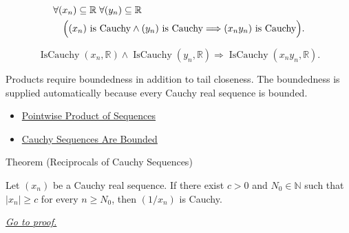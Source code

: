 \begin{remark*}
\[
\begin{aligned}
&\forall (x_n)\subseteq\mathbb{R}\;\forall (y_n)\subseteq\mathbb{R}\\
&\quad
\Bigl(
  (x_n)\text{ is Cauchy}
  \land
  (y_n)\text{ is Cauchy}
  \Longrightarrow
  (x_ny_n)\text{ is Cauchy}
\Bigr).
\end{aligned}
\]
\end{remark*}

\begin{remark*}
\[
\operatorname{IsCauchy}(x_n,\mathbb{R})
\land
\operatorname{IsCauchy}(y_n,\mathbb{R})
\Longrightarrow
\operatorname{IsCauchy}(x_ny_n,\mathbb{R}).
\]
\end{remark*}

\begin{remark*}[Interpretation]
Products require boundedness in addition to tail closeness. The boundedness
is supplied automatically because every Cauchy real sequence is bounded.
\end{remark*}

\begin{dependencies}
\begin{itemize}
  \item \hyperref[def:pointwise-product-sequence]{Pointwise Product of Sequences}
  \item \hyperref[thm:cauchy-sequences-are-bounded]{Cauchy Sequences Are Bounded}
\end{itemize}
\end{dependencies}


\begin{theorembox}{Theorem (Reciprocals of Cauchy Sequences)}
\begin{theorem}
\label{thm:reciprocal-cauchy-sequence}
Let $(x_n)$ be a Cauchy real sequence. If there exist $c>0$ and
$N_0\in\mathbb{N}$ such that $|x_n|\ge c$ for every $n\ge N_0$, then
$(1/x_n)$ is Cauchy.

\smallskip
\noindent
\hyperref[prf:reciprocal-cauchy-sequence]{\textit{Go to proof.}}
\end{theorem}
\end{theorembox}

